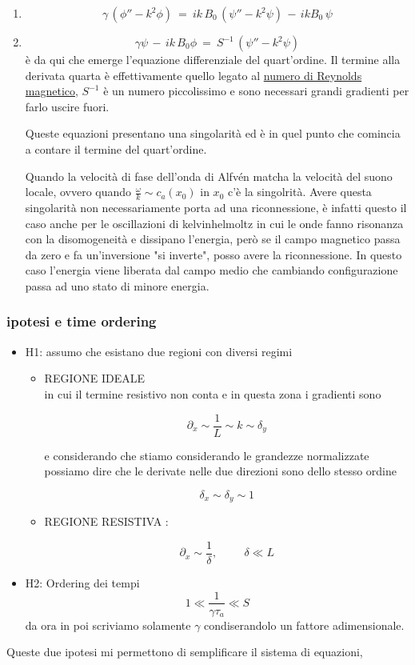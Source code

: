 \begin{enumerate}
	\item \[\gamma\,(\phi''-k^2\phi)\ =\ ik\,B_0\,(\psi''-k^2\psi)\,-\,ikB_0\,\psi\]
	\item \[\gamma\psi\,-\,ik\,B_0\phi\ =\ S^{-1}\,(\psi''-k^2\psi)\] 
	è da qui che emerge l'equazione differenziale del quart'ordine. Il termine alla derivata quarta è effettivamente quello legato al \underline{numero di Reynolds magnetico}, $S^{-1}$ è un numero piccolissimo e sono necessari grandi gradienti per farlo uscire fuori.
	
	Queste equazioni presentano una singolarità ed è in quel punto che comincia a contare il termine del quart'ordine. 
	
	Quando la velocità di fase dell'onda di Alfvén matcha la velocità del suono locale, ovvero quando $\frac{\omega}{k}\sim c_a(x_0)$ in $x_0$ c'è la singolrità. 
	Avere questa singolarità non necessariamente porta ad una riconnessione, è infatti questo il caso anche per le oscillazioni di kelvinhelmoltz  in cui le onde fanno risonanza con la disomogeneità e dissipano l'energia, però se il campo magnetico passa da zero e fa un'inversione "si inverte", posso avere la riconnessione. In questo caso l'energia  viene liberata dal campo medio che cambiando configurazione passa ad uno stato di minore energia. 
\end{enumerate}

%
%
\subsubsection{ipotesi e time ordering}  
\begin{itemize}
	\item H1: assumo che esistano due regioni con diversi regimi \begin{itemize}
		\item REGIONE IDEALE \\ in cui il termine resistivo non conta e in questa zona i gradienti sono 
		
		\[\partial_x\sim\frac{1}{L}\sim k\sim\delta_y\]
		
		e considerando che stiamo considerando le grandezze normalizzate possiamo dire che le derivate nelle due direzioni sono dello stesso ordine 
		
		\[\delta_x\sim\delta_y\sim1\]
		
		\item REGIONE RESISTIVA : 
		
		\[\partial _x\sim\frac{1}{\delta},\hspace{1cm}\delta\ll L\]
		
	\end{itemize}
	\item H2: Ordering dei tempi \[1\ll\frac{1}{\gamma\tau_a}\ll S\] da ora in poi scriviamo solamente $\gamma$ condiserandolo un fattore adimensionale.  
	
	
\end{itemize} 
Queste due ipotesi mi permettono di semplificare il sistema di equazioni,

